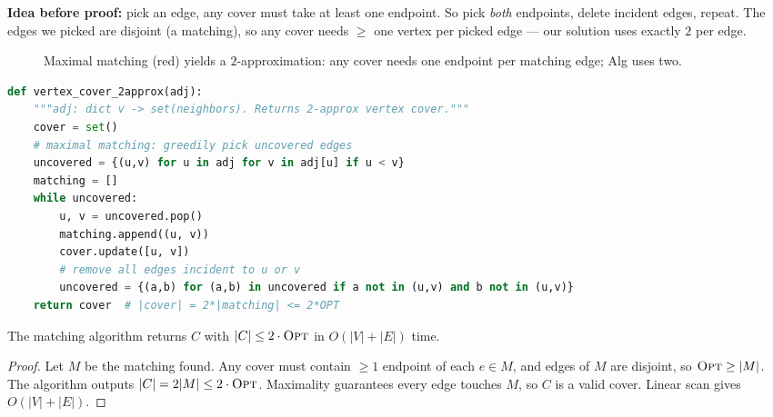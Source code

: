 \textbf{Idea before proof:} pick an edge, any cover must take at least one endpoint. So pick \emph{both} endpoints, delete incident edges, repeat. The edges we picked are disjoint (a matching), so any cover needs $\ge$ one vertex per picked edge --- our solution uses exactly $2$ per edge.

\begin{figure}[h]\centering
{}
\caption{Maximal matching (red) yields a $2$-approximation: any cover needs one endpoint per matching edge; Alg uses two.}
\label{fig:vc-matching}
\end{figure}

\begin{lstlisting}[language=Python]
def vertex_cover_2approx(adj):
    """adj: dict v -> set(neighbors). Returns 2-approx vertex cover."""
    cover = set()
    # maximal matching: greedily pick uncovered edges
    uncovered = {(u,v) for u in adj for v in adj[u] if u < v}
    matching = []
    while uncovered:
        u, v = uncovered.pop()
        matching.append((u, v))
        cover.update([u, v])
        # remove all edges incident to u or v
        uncovered = {(a,b) for (a,b) in uncovered if a not in (u,v) and b not in (u,v)}
    return cover  # |cover| = 2*|matching| <= 2*OPT
\end{lstlisting}

\begin{theorem}
The matching algorithm returns $C$ with $|C|\le 2\cdot\textsc{Opt}$ in $O(|V|+|E|)$ time.
\end{theorem}
\begin{proof}
Let $M$ be the matching found. Any cover must contain $\ge 1$ endpoint of each $e\in M$, and edges of $M$ are disjoint, so $\textsc{Opt}\ge |M|$. The algorithm outputs $|C|=2|M|\le 2\cdot\textsc{Opt}$. Maximality guarantees every edge touches $M$, so $C$ is a valid cover. Linear scan gives $O(|V|+|E|)$.
\end{proof}


